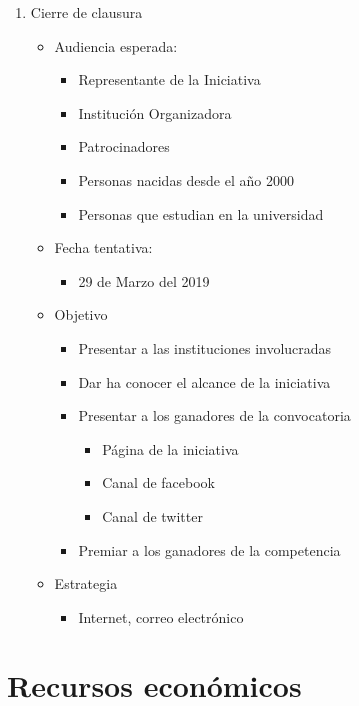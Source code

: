 \documentclass{article}
\begin{document}
\begin{enumerate}
\item Cierre de clausura
\begin{itemize}
\item Audiencia esperada:
\begin{itemize}
\item Representante de la Iniciativa
\item Institución Organizadora
\item Patrocinadores
\item Personas nacidas desde el año 2000
\item Personas que estudian en la universidad
\end{itemize}
\item Fecha tentativa:
\begin{itemize}
\item 29 de Marzo del 2019
\end{itemize}
\item Objetivo
\begin{itemize}
\item Presentar a las instituciones involucradas
\item Dar ha conocer el alcance de la iniciativa
\item Presentar a los ganadores de la convocatoria
\begin{itemize}
\item Página de la iniciativa 
\item Canal de facebook
\item Canal de twitter
\end{itemize}
\item Premiar a los ganadores de la competencia
\end{itemize}
\item Estrategia
\begin{itemize}
\item Internet, correo electrónico
\end{itemize}
\end{itemize}
\end{enumerate}


\section{Recursos económicos}
\end{document}
